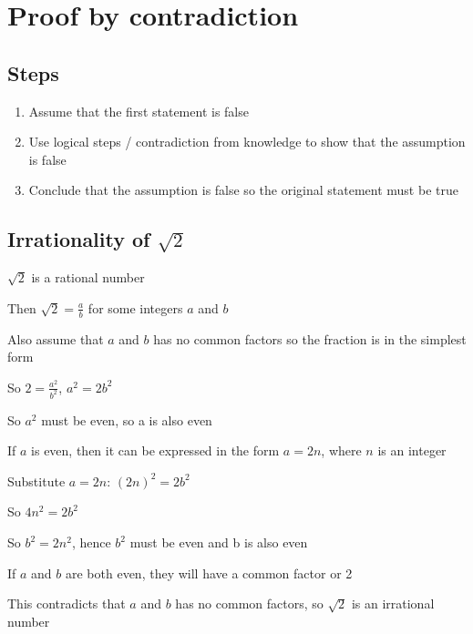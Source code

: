 \section{Proof by contradiction}
\subsection{Steps}
\begin{enumerate}
    \item Assume that the first statement is false
    \item Use logical steps / contradiction from knowledge to show that the assumption is false
    \item Conclude that the assumption is false so the original statement must be true
\end{enumerate}
\subsection{Irrationality of $\sqrt{2}$}
\begin{description}
    \item [Assumption:] $\sqrt{2}$ is a rational number
    \item Then $\sqrt{2} = \frac{a}{b}$ for some integers $a$ and $b$
    \item Also assume that $a$ and $b$ has no common factors so the fraction is in the simplest form
    \item So $2=\frac{a^2}{b^2}$, $a^2=2b^2$
    \item So $a^2$ must be even, so a is also even
    \item If $a$ is even, then it can be expressed in the form $a=2n$, where $n$ is an integer
    \item Substitute $a=2n$: $(2n)^2=2b^2$
    \item So $4n^2 = 2b^2$
    \item So $b^2=2n^2$, hence $b^2$ must be even and b is also even
    \item If $a$ and $b$ are both even, they will have a common factor or 2
    \item This contradicts that $a$ and $b$ has no common factors, so $\sqrt{2}$ is an irrational number
\end{description}


